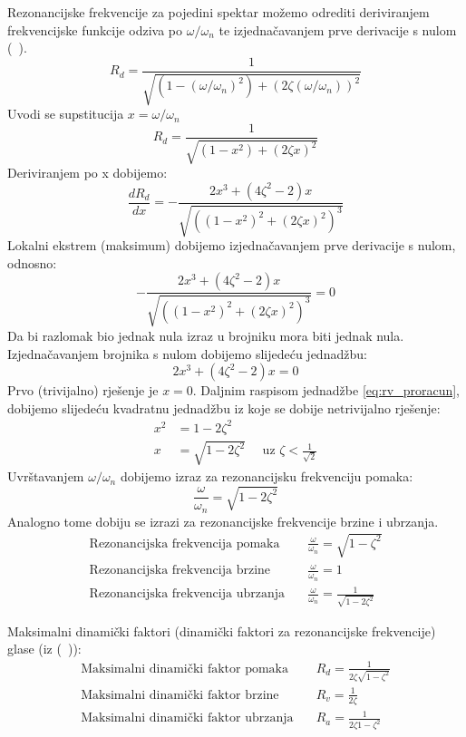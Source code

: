 Rezonancijske frekvencije za pojedini spektar možemo odrediti deriviranjem frekvencijske 
funkcije odziva po $\omega/\omega_n$ te izjednačavanjem prve derivacije s
nulom (~\cite{chopra2011}).
\[
    R_d = \frac{1}{\sqrt{(1-(\omega/\omega_n)^2) + (2\zeta(\omega/\omega_n))^2}}
\]
Uvodi se supstitucija $x=\omega/\omega_n$
\[
    R_d = \frac{1}{\sqrt{(1-x^2)+(2\zeta x)^2}}
\]
Deriviranjem po x dobijemo:
\[
    \frac{dR_d}{dx}=-\frac{2x^3+(4\zeta^2-2)x}{\sqrt{((1-x^2)^2+(2\zeta x)^2)^3}}
\]
Lokalni ekstrem (maksimum) dobijemo izjednačavanjem prve derivacije s nulom,
odnosno:
\[
    -\frac{2x^3+(4\zeta^2-2)x}{\sqrt{((1-x^2)^2+(2\zeta x)^2)^3}} = 0
\]
Da bi razlomak bio jednak nula izraz u brojniku mora biti jednak nula.
Izjednačavanjem brojnika s nulom dobijemo slijedeću jednadžbu:
\begin{equation}\label{eq:rv_proracun}
    2x^3 + (4\zeta^2 -2)x = 0
\end{equation}
Prvo (trivijalno) rješenje je $x=0$. Daljnim raspisom jednadžbe \eqref{eq:rv_proracun},
dobijemo slijedeću kvadratnu jednadžbu iz koje se dobije netrivijalno rješenje:
\[
    \begin{aligned}
        x^2 &= 1-2\zeta^2\\
        x &= \sqrt{1-2\zeta^2} \quad \text{ uz } \zeta < \frac{1}{\sqrt{2}}
    \end{aligned}
\]
Uvrštavanjem $\omega/\omega_n$ dobijemo izraz za rezonancijsku frekvenciju pomaka:
\begin{equation}\label{eq:rezonantna_frekvencija_pomak}
    \frac{\omega}{\omega_n}=\sqrt{1-2\zeta^2}
\end{equation}
Analogno tome dobiju se izrazi za rezonancijske frekvencije brzine i ubrzanja.
\begin{align}
    \text{Rezonancijska frekvencija pomaka}\quad & \frac{\omega}{\omega_n} = \sqrt{1-\zeta^2}\label{eq:rd_rezonanca}\\
    \text{Rezonancijska frekvencija brzine}\quad & \frac{\omega}{\omega_n} = 1 \label{eq:rv_rezonanca}\\
    \text{Rezonancijska frekvencija ubrzanja}\quad & \frac{\omega}{\omega_n} = \frac{1}{\sqrt{1-2\zeta^2}}\label{eq:ra_rezonanca}
\end{align}

Maksimalni dinamički faktori (dinamički faktori za rezonancijske frekvencije) glase
(iz (~\cite{chopra2011})):
\begin{align}
    \text{Maksimalni dinamički faktor pomaka}\quad & R_d = \frac{1}{2\zeta\sqrt{1-\zeta^2}}\\
    \text{Maksimalni dinamički faktor brzine}\quad & R_v = \frac{1}{2\zeta}\\
    \text{Maksimalni dinamički faktor ubrzanja}\quad & R_a = \frac{1}{2\zeta{1-\zeta^2}}
\end{align}

